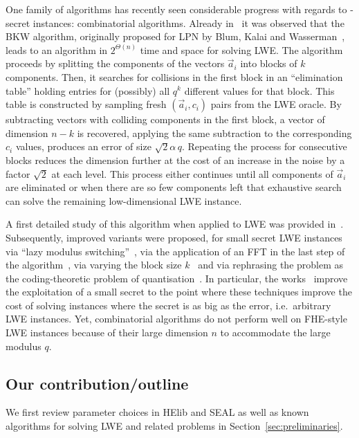 \documentclass[a4paper]{llncs}
\begin{document}
One family of algorithms has recently seen considerable progress with regards to \B{}-secret instances: combinatorial algorithms. Already in~\cite{JACM:Regev09} it was observed that the BKW algorithm, originally proposed for LPN by Blum, Kalai and Wasserman~\cite{STOC:BluKalWas00}, leads to an algorithm in $2^{Θ(n)}$ time and space for solving LWE\@. The algorithm proceeds by splitting the components of the vectors $\vec{a}_i$ into blocks of $k$ components. Then, it searches for collisions in the first block in an ``elimination table'' holding entries for (possibly) all $q^k$ different values for that block. This table is constructed by sampling fresh $(\vec{a}_i, c_i)$ pairs from the LWE oracle. By subtracting vectors with colliding components in the first block, a vector of dimension $n-k$ is recovered, applying the same subtraction to the corresponding $c_i$ values, produces an error of size $\sqrt{2}α\,q$. Repeating the process for consecutive blocks reduces the dimension further at the cost of an increase in the noise by a factor $\sqrt{2}$ at each level. This process either continues until all components of $\vec{a}_i$ are eliminated or when there are so few components left that exhaustive search can solve the remaining low-dimensional LWE instance.

A first detailed study of this algorithm when applied to LWE was provided in~\cite{DCC:ACFFP15}. Subsequently, improved variants were proposed, for small secret LWE instances via ``lazy modulus switching''~\cite{PKC:AFFP14}, via the application of an FFT in the last step of the algorithm~\cite{EC:DucTraVau15}, via varying the block size $k$~\cite{C:KirFou15} and via rephrasing the problem as the coding-theoretic problem of quantisation~\cite{C:GuoJohSta15}. In particular, the works~\cite{C:KirFou15,C:GuoJohSta15} improve the exploitation of a small secret to the point where these techniques improve the cost of solving instances where the secret is as big as the error, i.e.\ arbitrary LWE instances. Yet, combinatorial algorithms do not perform well on FHE-style LWE instances because of their large dimension $n$ to accommodate the large modulus \(q\).

\subsection{Our contribution/outline}

We first review parameter choices in HElib and SEAL as well as known algorithms for solving LWE and related problems in Section~\ref{sec:preliminaries}.
\end{document}
